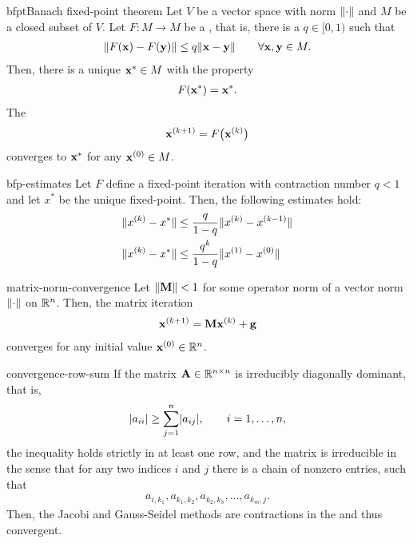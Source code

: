 \begin{Theorem*}{bfpt}{Banach fixed-point theorem}
  Let $V$ be a vector space with norm $\lVert\cdot\rVert$ and $M$ be a
  closed subset of $V$. Let $F\colon M\to M$ be a ,
  that is, there is a  $q\in[0,1)$ such that
  \begin{gather}
    \norm*{F(\vx)-F(\vy)} \le q \norm*{\vx-\vy}\qquad\forall \vx,\vy\in M.
  \end{gather}
  Then, there is a unique  $\mathbf x^*\in M$ with the property
  \begin{gather}
    F(\mathbf x^*) = \mathbf x^*.
  \end{gather}
  The 
  \begin{gather}
    \mathbf x^{(k+1)} = F\bigl(\mathbf x^{(k)}\bigr)
  \end{gather}
  converges to $\mathbf x^*$ for any $\mathbf x^{(0)}\in M$.
\end{Theorem*}

\begin{Corollary}{bfp-estimates}
  Let $F$ define a fixed-point iteration with contraction number $q<1$
  and let $x^*$ be the unique fixed-point. Then, the following
  estimates hold:
  \begin{align}
    \lVert x^{(k)} - x^*\rVert &\le \frac{q}{1-q} \lVert x^{(k)}-x^{(k-1)}\rVert\\
    \lVert x^{(k)} - x^*\rVert &\le \frac{q^k}{1-q} \lVert x^{(1)}-x^{(0)}\rVert
  \end{align}
\end{Corollary}  

\begin{Corollary}{matrix-norm-convergence}
  Let $\lVert\mathbf M\rVert < 1$ for some operator norm of a vector norm $\lVert\cdot\rVert$ on $\mathbb R^n$. Then, the matrix iteration
  \begin{gather}
    \mathbf x^{(k+1)} = \mathbf M \mathbf x^{(k)} + \mathbf g
  \end{gather}
  converges for any initial value $\mathbf x^{(0)}\in\mathbb R^n$.
\end{Corollary}

\begin{Example}{convergence-row-sum}
  If the matrix $\mathbf A\in\mathbb R^{n\times n}$ is irreducibly diagonally dominant, that is,
  \begin{gather}
    \lvert a_{ii}\rvert \ge \sum_{j=1}^n \lvert a_{ij}\rvert,\qquad i=1,\dots,n,
  \end{gather}
  the inequality holds strictly in at least one row, and the matrix is
  irreducible in the sense that for any two indices $i$ and $j$ there
  is a chain of nonzero entries, such that
  \begin{gather}
    a_{i,k_{1}}, a_{k_{1},k_{2}}, a_{k_{2},k_{3}},\dots, a_{k_{m},j}.
  \end{gather}
  Then, the Jacobi and Gauss-Seidel methods are contractions in the
   and thus convergent.
\end{Example}


